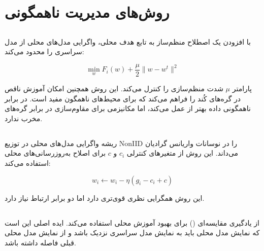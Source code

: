 \section{روش‌های مدیریت ناهمگونی}
\label{sec:rw_hetero}

\subsection{}

 \cite{li2020federated} با افزودن یک اصطلاح منظم‌ساز به تابع هدف محلی، واگرایی مدل‌های محلی از مدل سراسری را محدود می‌کند:

\begin{equation}
    \min_w F_i(w) + \frac{\mu}{2}\|w - w^t\|^2
    \label{eq:fedprox}
\end{equation}

پارامتر $\mu$ شدت منظم‌سازی را کنترل می‌کند. این روش همچنین امکان آموزش ناقص در گره‌های کُند را فراهم می‌کند که برای محیط‌های ناهمگون مفید است.  در برابر ناهمگونی داده بهتر از  عمل می‌کند، اما مکانیزمی برای مقاوم‌سازی در برابر گره‌های مخرب ندارد.

\subsection{}

 \cite{karimireddy2020scaffold} ریشه واگرایی مدل‌های محلی در توزیع \gls{NonIID} را در نوسانات واریانس گرادیان می‌داند. این روش از متغیرهای کنترلی $c_i$ و $c$ برای اصلاح به‌روزرسانی‌های محلی استفاده می‌کند:

\begin{equation}
    w_i \leftarrow w_i - \eta (g_i - c_i + c)
    \label{eq:scaffold}
\end{equation}

این روش همگرایی نظری قوی‌تری دارد اما دو برابر  ارتباط نیاز دارد.

\subsection{}

 \cite{li2021model} از یادگیری مقایسه‌ای () برای بهبود آموزش محلی استفاده می‌کند. ایده اصلی این است که نمایش مدل محلی باید به نمایش مدل سراسری نزدیک باشد و از نمایش مدل محلی قبلی فاصله داشته باشد.

\subsection{}

